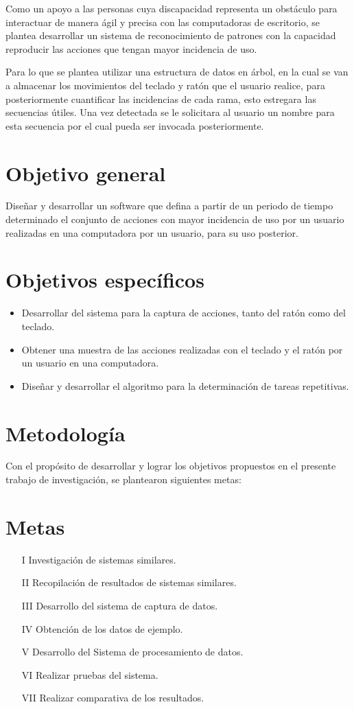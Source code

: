 Como un apoyo a las personas cuya discapacidad representa un obstáculo para
 interactuar de manera ágil y precisa con las computadoras de escritorio, se
 plantea desarrollar un sistema de reconocimiento de patrones con la capacidad
 reproducir las acciones que tengan mayor incidencia de uso. 
 
Para lo que se plantea utilizar una estructura de datos en árbol, en la cual
 se van a almacenar los movimientos del teclado y ratón que el usuario realice,
 para posteriormente cuantificar las incidencias de cada rama, esto estregara
 las secuencias útiles. Una vez detectada se le solicitara al usuario un nombre
 para esta secuencia por el cual pueda ser invocada posteriormente.


\section{Objetivo general} 
Diseñar y desarrollar un software que defina a partir de un periodo de tiempo
 determinado el conjunto de acciones con mayor incidencia de uso por un usuario
 realizadas en una computadora por un usuario, para su uso posterior.

\section{Objetivos específicos}
\begin{itemize}
  \item Desarrollar del sistema para la captura de acciones, tanto del  ratón
  como del teclado.
  \item Obtener una muestra de las acciones realizadas con el teclado y el 
  ratón por un usuario en una computadora.
  \item Diseñar y desarrollar el algoritmo para la determinación de tareas
  repetitivas.
\end{itemize}


\section{Metodología}
Con el propósito de desarrollar y lograr los objetivos propuestos en el presente trabajo de investigación, se plantearon siguientes metas:
\section*{Metas}
\begin{itemize}
  \item[I] Investigación de sistemas similares.
  \item[II] Recopilación de resultados de sistemas similares.
  \item[III] Desarrollo del sistema  de captura de datos.
  \item[IV] Obtención de los datos de ejemplo.
  \item[V] Desarrollo del Sistema de procesamiento de datos.
  \item[VI] Realizar pruebas del sistema.
  \item[VII] Realizar comparativa de los resultados.
\end{itemize}


